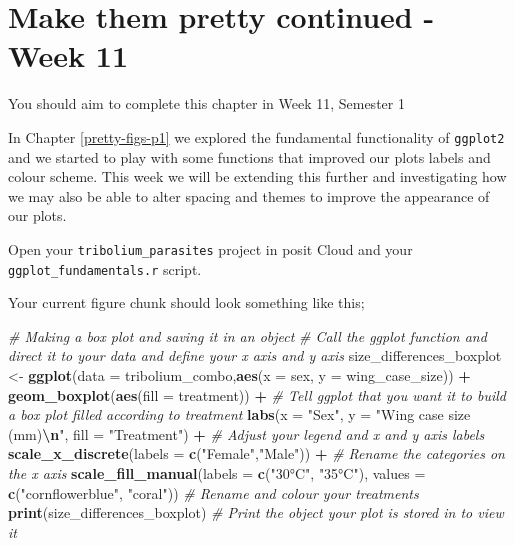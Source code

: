 \documentclass[
]{book}
\newenvironment{Shaded}{\begin{snugshade}}{\end{snugshade}}
\newcommand{\AttributeTok}[1]{\textcolor[rgb]{0.13,0.29,0.53}{#1}}
\newcommand{\CommentTok}[1]{\textcolor[rgb]{0.56,0.35,0.01}{\textit{#1}}}
\newcommand{\FunctionTok}[1]{\textcolor[rgb]{0.13,0.29,0.53}{\textbf{#1}}}
\newcommand{\NormalTok}[1]{#1}
\newcommand{\OtherTok}[1]{\textcolor[rgb]{0.56,0.35,0.01}{#1}}
\newcommand{\SpecialCharTok}[1]{\textcolor[rgb]{0.81,0.36,0.00}{\textbf{#1}}}
\newcommand{\StringTok}[1]{\textcolor[rgb]{0.31,0.60,0.02}{#1}}
\begin{document}
\chapter{Make them pretty continued - Week 11}\label{pretty-figs-p2}

You should aim to complete this chapter in Week 11, Semester 1

In Chapter \ref{pretty-figs-p1} we explored the fundamental functionality of \texttt{ggplot2} and we started to play with some functions that improved our plots labels and colour scheme. This week we will be extending this further and investigating how we may also be able to alter spacing and themes to improve the appearance of our plots.

Open your \texttt{tribolium\_parasites} project in posit Cloud and your \texttt{ggplot\_fundamentals.r} script.

Your current figure chunk should look something like this;

\begin{Shaded}
\begin{Highlighting}[]
\CommentTok{\# Making a box plot and saving it in an object}
\CommentTok{\# Call the ggplot function and direct it to your data and define your x axis and y axis}
\NormalTok{size\_differences\_boxplot }\OtherTok{\textless{}{-}} \FunctionTok{ggplot}\NormalTok{(}\AttributeTok{data =}\NormalTok{ tribolium\_combo,}\FunctionTok{aes}\NormalTok{(}\AttributeTok{x =}\NormalTok{ sex, }\AttributeTok{y =}\NormalTok{ wing\_case\_size)) }\SpecialCharTok{+} 
  \FunctionTok{geom\_boxplot}\NormalTok{(}\FunctionTok{aes}\NormalTok{(}\AttributeTok{fill =}\NormalTok{ treatment)) }\SpecialCharTok{+} \CommentTok{\# Tell ggplot that you want it to build a box plot filled according to treatment}
  \FunctionTok{labs}\NormalTok{(}\AttributeTok{x =} \StringTok{"Sex"}\NormalTok{, }\AttributeTok{y =} \StringTok{"Wing case size (mm)}\SpecialCharTok{\textbackslash{}n}\StringTok{"}\NormalTok{, }\AttributeTok{fill =} \StringTok{"Treatment"}\NormalTok{) }\SpecialCharTok{+} \CommentTok{\# Adjust your legend and x and y axis labels }
  \FunctionTok{scale\_x\_discrete}\NormalTok{(}\AttributeTok{labels =} \FunctionTok{c}\NormalTok{(}\StringTok{"Female"}\NormalTok{,}\StringTok{"Male"}\NormalTok{)) }\SpecialCharTok{+} \CommentTok{\# Rename the categories on the x axis }
  \FunctionTok{scale\_fill\_manual}\NormalTok{(}\AttributeTok{labels =} \FunctionTok{c}\NormalTok{(}\StringTok{"30°C"}\NormalTok{, }\StringTok{"35°C"}\NormalTok{), }\AttributeTok{values =} \FunctionTok{c}\NormalTok{(}\StringTok{"cornflowerblue"}\NormalTok{, }\StringTok{"coral"}\NormalTok{)) }\CommentTok{\# Rename and colour your treatments}
\FunctionTok{print}\NormalTok{(size\_differences\_boxplot) }\CommentTok{\# Print the object your plot is stored in to view it}
\end{Highlighting}
\end{Shaded}
\end{document}
